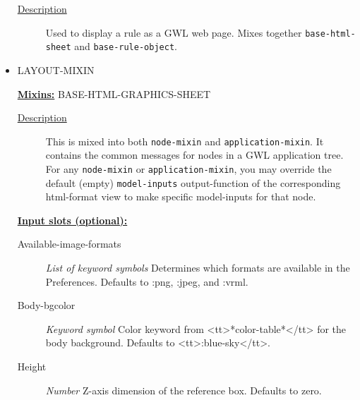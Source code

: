 \documentclass [11pt]{book}
\begin{document}
\begin{itemize}
\begin{description}
\item [
\underline{Description}]


Used to display a rule as a GWL web page. 
Mixes together \texttt{base-html-sheet} and \texttt{base-rule-object}.



\end{description}









\item {}LAYOUT-MIXIN


\textbf{
\underline{Mixins:}} BASE-HTML-GRAPHICS-SHEET





\begin{description}

\item [
\underline{Description}]


This is mixed into both \texttt{node-mixin} and \texttt{application-mixin}. It contains the common
messages for nodes in a GWL application tree. For any \texttt{node-mixin} or \texttt{application-mixin}, you may override the default (empty)
\texttt{model-inputs} output-function of the corresponding html-format view to make specific model-inputs for that node.



\end{description}








\textbf{
\underline{Input slots (optional):}}

\begin{description}

\item [Available-image-formats]
\emph{List of keyword symbols} Determines which formats are available in the Preferences. Defaults to :png, :jpeg, and :vrml.


\item [Body-bgcolor]
\emph{Keyword symbol} Color keyword from <tt>*color-table*</tt> for the body background. Defaults to <tt>:blue-sky</tt>.


\item [Height]
\emph{Number} Z-axis dimension of the reference box. Defaults to zero.



\end{description}
\end{itemize}
\end{document}
